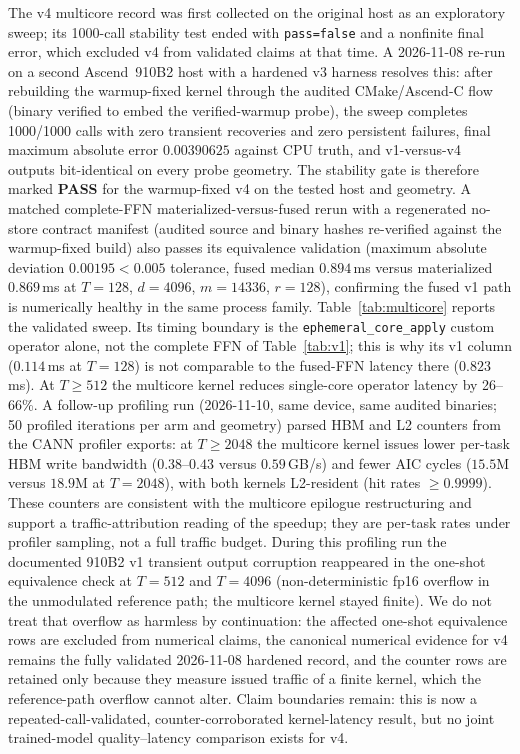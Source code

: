 The v4 multicore record was first collected on the original host as an
exploratory sweep; its 1000-call stability test ended with
\texttt{pass=false} and a nonfinite final error, which excluded v4 from
validated claims at that time. A 2026-11-08 re-run on a second
Ascend~910B2 host with a hardened v3 harness resolves this: after
rebuilding the warmup-fixed kernel through the audited CMake/Ascend-C
flow (binary verified to embed the verified-warmup probe), the sweep
completes 1000/1000 calls with zero transient recoveries and zero
persistent failures, final maximum absolute error $0.00390625$ against
CPU truth, and v1-versus-v4 outputs bit-identical on every probe
geometry. The stability gate is therefore marked
\textbf{PASS} for the warmup-fixed v4 on the tested host and geometry.
A matched complete-FFN materialized-versus-fused rerun with a regenerated
no-store contract manifest (audited source and binary hashes re-verified
against the warmup-fixed build) also passes its equivalence validation
(maximum absolute deviation $0.00195 < 0.005$ tolerance, fused median
$0.894$\,ms versus materialized $0.869$\,ms at $T{=}128$,
$d{=}4096$, $m{=}14336$, $r{=}128$), confirming the fused v1 path is
numerically healthy in the same process family.
Table~\ref{tab:multicore} reports the validated sweep. Its timing
boundary is the \texttt{ephemeral\_core\_apply} custom operator alone,
not the complete FFN of Table~\ref{tab:v1}; this is why its v1 column
($0.114$\,ms at $T{=}128$) is not comparable to the fused-FFN latency
there ($0.823$\,ms). At $T\ge512$ the multicore kernel reduces
single-core operator latency by 26--66\%. A follow-up profiling run (2026-11-10,
same device, same audited binaries; 50 profiled iterations per arm and
geometry) parsed HBM and L2 counters from the CANN profiler exports: at
$T\ge2048$ the multicore kernel issues lower per-task HBM write
bandwidth ($0.38$--$0.43$ versus $0.59$\,GB/s) and fewer AIC cycles
($15.5$M versus $18.9$M at $T{=}2048$), with both kernels
L2-resident (hit rates $\ge0.9999$). These counters are consistent with
the multicore epilogue restructuring and support a traffic-attribution
reading of the speedup; they are per-task rates under profiler sampling,
not a full traffic budget. During this profiling run the documented
910B2 v1 transient output corruption reappeared in the one-shot
equivalence check at $T{=}512$ and $T{=}4096$ (non-deterministic fp16
overflow in the unmodulated reference path; the multicore kernel stayed
finite). We do not treat that overflow as harmless by continuation:
the affected one-shot equivalence rows are excluded from numerical
claims, the canonical numerical evidence for v4 remains the fully
validated 2026-11-08 hardened record, and the counter rows are retained
only because they measure issued traffic of a finite kernel, which the
reference-path overflow cannot alter. Claim boundaries remain: this is
now a repeated-call-validated, counter-corroborated kernel-latency
result, but no joint trained-model quality--latency comparison exists
for v4.

